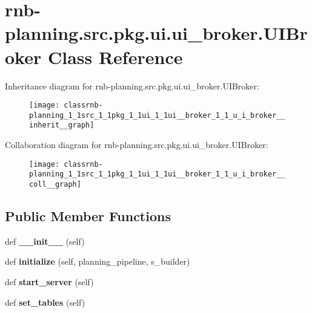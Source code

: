 \hypertarget{classrnb-planning_1_1src_1_1pkg_1_1ui_1_1ui__broker_1_1_u_i_broker}{}\section{rnb-\/planning.src.\+pkg.\+ui.\+ui\+\_\+broker.\+U\+I\+Broker Class Reference}
\label{classrnb-planning_1_1src_1_1pkg_1_1ui_1_1ui__broker_1_1_u_i_broker}


Inheritance diagram for rnb-\/planning.src.\+pkg.\+ui.\+ui\+\_\+broker.\+U\+I\+Broker\+:
\nopagebreak
\begin{figure}[H]
\begin{center}
\leavevmode
\texttt{[image: classrnb-planning\_1\_1src\_1\_1pkg\_1\_1ui\_1\_1ui\_\_broker\_1\_1\_u\_i\_broker\_\_inherit\_\_graph]}
\end{center}
\end{figure}


Collaboration diagram for rnb-\/planning.src.\+pkg.\+ui.\+ui\+\_\+broker.\+U\+I\+Broker\+:
\nopagebreak
\begin{figure}[H]
\begin{center}
\leavevmode
\texttt{[image: classrnb-planning\_1\_1src\_1\_1pkg\_1\_1ui\_1\_1ui\_\_broker\_1\_1\_u\_i\_broker\_\_coll\_\_graph]}
\end{center}
\end{figure}
\subsection*{Public Member Functions}
\begin{DoxyCompactItemize}
\item 
\mbox{\label{classrnb-planning_1_1src_1_1pkg_1_1ui_1_1ui__broker_1_1_u_i_broker_aeaa4c1df3279c9635ab3c7b09cb675a3}} 
def {\bfseries \+\_\+\+\_\+init\+\_\+\+\_\+} (self)
\item 
\mbox{\label{classrnb-planning_1_1src_1_1pkg_1_1ui_1_1ui__broker_1_1_u_i_broker_a16de86c6597bb846e3c6301d8130dc83}} 
def {\bfseries initialize} (self, planning\+\_\+pipeline, s\+\_\+builder)
\item 
\mbox{\label{classrnb-planning_1_1src_1_1pkg_1_1ui_1_1ui__broker_1_1_u_i_broker_ac8698ddb4f4f02de69873f5d5e42b3e9}} 
def {\bfseries start\+\_\+server} (self)
\item 
\mbox{\label{classrnb-planning_1_1src_1_1pkg_1_1ui_1_1ui__broker_1_1_u_i_broker_a8f6441b3ebd8aa6fd0fefb369fd884f4}} 
def {\bfseries set\+\_\+tables} (self)
\end{DoxyCompactItemize}
